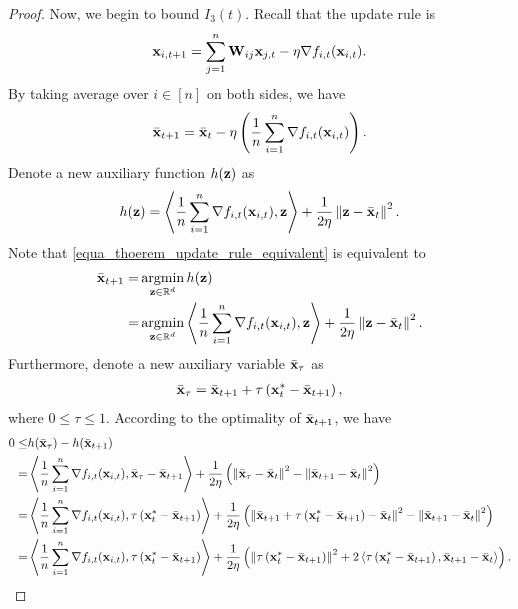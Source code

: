\documentclass{article}
\begin{document}
\begin{proof}
Now, we begin to bound $I_3(t)$. Recall that the update rule is 
\begin{align}
\nonumber
{\bf x}_{i,t+1} = \sum_{j=1}^n {\bf W}_{ij}{\bf x}_{j,t} - \eta \nabla f_{i,t}({\bf x}_{i,t}).
\end{align} By taking average over $i\in[n]$ on both sides, we have 
\begin{align}
\label{equa_thoerem_update_rule_equivalent}
\bar{{\bf x}}_{t+1} = \bar{{\bf x}}_t - \eta \left( \frac{1}{n}\sum_{i=1}^n \nabla f_{i,t}({\bf x}_{i,t}) \right).
\end{align} 
Denote a new auxiliary function $h({\bf z})$ as 
\begin{align}
\nonumber
h({\bf z}) = \left\langle\frac{1}{n}\sum_{i=1}^n \nabla f_{i,t}({\bf x}_{i,t}), {\bf z} \right\rangle + \frac{1}{2\eta}\left\lVert{\bf z} - \bar{{\bf x}}_t\right\rVert^2.
\end{align} Note that \eqref{equa_thoerem_update_rule_equivalent} is equivalent to 
\begin{align}
\nonumber
\bar{\x}_{t+1} = & \argmin_{\z\in\RR^d} h(\z) \\ \nonumber
= & \argmin_{\z\in\RR^d} \lrangle{\frac{1}{n}\sum_{i=1}^n \nabla f_{i,t}(\x_{i,t}), \z} + \frac{1}{2\eta}\lrnorm{\z - \bar{\x}_t}^2.
\end{align} Furthermore, denote a new auxiliary variable $\bar{{\bf x}}_{\tau}$ as  
\begin{align}
\nonumber
\bar{{\bf x}}_{\tau} = \bar{{\bf x}}_{t+1} + \tau \left( {\bf x}_t^\ast - \bar{{\bf x}}_{t+1} \right),
\end{align} where $0\le \tau \le 1$. According to the optimality of $\bar{{\bf x}}_{t+1}$, we have
\begin{align}
\nonumber
0 \le & h(\bar{\x}_{\tau}) - h(\bar{\x}_{t+1}) \\ \nonumber
= & \lrangle{\frac{1}{n}\sum_{i=1}^n \nabla f_{i,t}(\x_{i,t}), \bar{\x}_{\tau} - \bar{\x}_{t+1}} + \frac{1}{2\eta}\lrincir{ \lrnorm{\bar{\x}_{\tau} - \bar{\x}_t}^2 - \lrnorm{\bar{\x}_{t+1} - \bar{\x}_t}^2 } \\ \nonumber
= & \lrangle{\frac{1}{n}\sum_{i=1}^n \nabla f_{i,t}(\x_{i,t}), \tau \lrincir{\x_t^\ast - \bar{\x}_{t+1}}} + \frac{1}{2\eta}\lrincir{ \lrnorm{\bar{\x}_{t+1} + \tau \lrincir{\x_t^\ast - \bar{\x}_{t+1}} - \bar{\x}_t}^2 - \lrnorm{\bar{\x}_{t+1} - \bar{\x}_t}^2 } \\ \nonumber
= & \lrangle{\frac{1}{n}\sum_{i=1}^n \nabla f_{i,t}(\x_{i,t}), \tau \lrincir{\x_t^\ast - \bar{\x}_{t+1}}} + \frac{1}{2\eta}\lrincir{ \lrnorm{\tau \lrincir{\x_t^\ast - \bar{\x}_{t+1}}}^2 + 2\lrangle{\tau \lrincir{\x_t^\ast - \bar{\x}_{t+1}}, \bar{\x}_{t+1} - \bar{\x}_t } }.

\end{align}
\end{proof}
\end{document}
